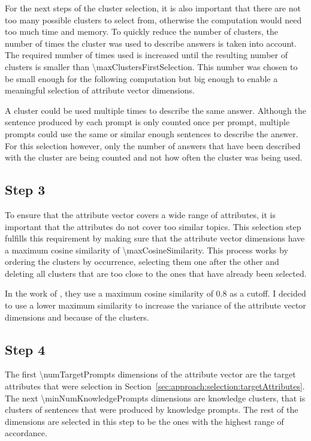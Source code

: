 For the next steps of the cluster selection, it is also important that there are not too many possible clusters to select from, otherwise the computation would need too much time and memory. To quickly reduce the number of clusters, the number of times the cluster was used to describe answers is taken into account. The required number of times used is increased until the resulting number of clusters is smaller than \num{\maxClustersFirstSelection}. This number was chosen to be small enough for the following computation but big enough to enable a meaningful selection of attribute vector dimensions.

A cluster could be used multiple times to describe the same answer. Although the sentence produced by each prompt is only counted once per prompt, multiple prompts could use the same or similar enough sentences to describe the answer. For this selection however, only the number of answers that have been described with the cluster are being counted and not how often the cluster was being used.

\subsection{Step 3}
To ensure that the attribute vector covers a wide range of attributes, it is important that the attributes do not cover too similar topics. This selection step fulfills this requirement by making sure that the attribute vector dimensions have a maximum cosine similarity of \num{\maxCosineSimilarity}. This process works by ordering the clusters by occurrence, selecting them one after the other and deleting all clusters that are too close to the ones that have already been selected.

In the work of \citeauthor{patelLearningInterpretableStyle2023}, they use a maximum cosine similarity of \num{0.8} as a cutoff. I decided to use a lower maximum similarity to increase the variance of the attribute vector dimensions and because of the clusters. %

\subsection{Step 4}
The first \num{\numTargetPrompts} dimensions of the attribute vector are the target attributes that were selection in Section~\ref{sec:approach:selection:targetAttributes}. The next \num{\minNumKnowledgePrompts} dimensions are knowledge clusters, that is clusters of sentences that were produced by knowledge prompts. The rest of the dimensions are selected in this step to be the ones with the highest range of accordance. %

